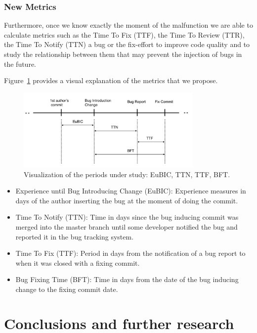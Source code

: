\documentclass[a4paper]{article}
\begin{document}
\subsubsection{New Metrics}

Furthermore, once we know exactly the moment of the malfunction we are able to calculate metrics such as the Time To Fix (TTF), the Time To Review (TTR), the Time To Notify (TTN) a bug or the fix-effort to improve code quality and to study the relationship between them that may prevent the injection of bugs in the future.

Figure~\ref{fig:metrics} provides a visual explanation of the metrics that we propose.

\begin{figure}[ht]
\centering
\includegraphics[height=4cm]{metrics.png}
\caption{Visualization of the periods under study: EuBIC, TTN, TTF, BFT.}
\label{fig:metrics}       %
\end{figure}

\begin{itemize}
\item{Experience until Bug Introducing Change (EuBIC):}
Experience measures in days of the author inserting the bug at the moment of doing the commit. 
\item{Time To Notify (TTN):}
Time in days since the bug inducing commit was merged into the master branch until some developer notified the bug and reported it in the bug tracking system. 
\item{Time To Fix (TTF):}
Period in days from the notification of a bug report to when it was closed with a fixing commit.
\item{Bug Fixing Time (BFT):}
Time in days from the date of the bug inducing change to the fixing commit date.
\end{itemize}


\section{Conclusions and further research}
\end{document}
